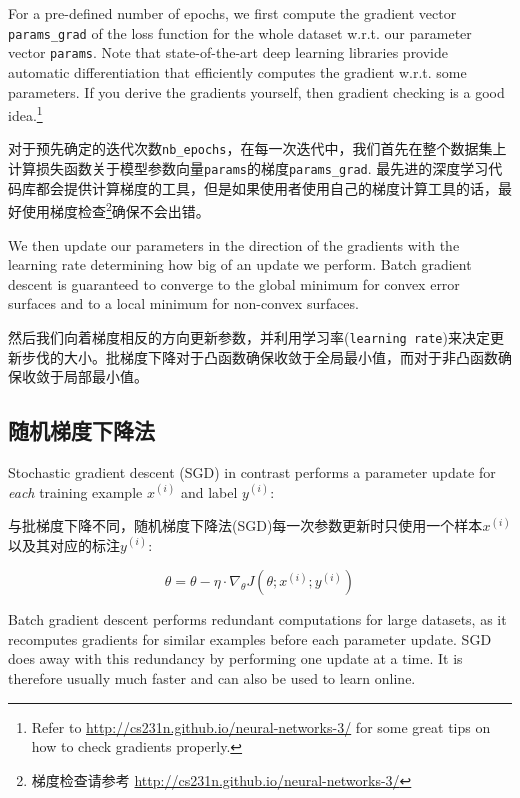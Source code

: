 \documentclass{article}
\begin{document}
For a pre-defined number of epochs,  we first compute the gradient vector \lstinline{params_grad} of the loss function for the whole dataset w.r.t. our parameter vector \lstinline{params}.  Note that state-of-the-art deep learning libraries provide automatic differentiation that efficiently computes the gradient w.r.t. some parameters. If you derive the gradients yourself, then gradient checking is a good idea.\footnote{Refer to \url{http://cs231n.github.io/neural-networks-3/} for some great tips on how to check gradients properly.}

对于预先确定的迭代次数\lstinline{nb_epochs}，在每一次迭代中，我们首先在整个数据集上计算损失函数关于模型参数向量\lstinline{params}的梯度\lstinline{params_grad}. 最先进的深度学习代码库都会提供计算梯度的工具，但是如果使用者使用自己的梯度计算工具的话，最好使用梯度检查\footnote{梯度检查请参考 \url{http://cs231n.github.io/neural-networks-3/}}确保不会出错。

We then update our parameters in the direction of the gradients with the learning rate determining how big of an update we perform. Batch gradient descent is guaranteed to converge to the global minimum for convex error surfaces and to a local minimum for non-convex surfaces.

然后我们向着梯度相反的方向更新参数，并利用学习率(\lstinline{learning rate})来决定更新步伐的大小。批梯度下降对于凸函数确保收敛于全局最小值，而对于非凸函数确保收敛于局部最小值。

\subsection{随机梯度下降法}

Stochastic gradient descent (SGD) in contrast performs a parameter update for \emph{each} training example $x^{(i)}$ and label $y^{(i)}$:

与批梯度下降不同，随机梯度下降法(SGD)每一次参数更新时只使用一个样本$x^{(i)}$以及其对应的标注$y^{(i)}$:

\begin{equation}
\theta = \theta - \eta \cdot \nabla_\theta J( \theta; x^{(i)}; y^{(i)})
\end{equation}

Batch gradient descent performs redundant computations for large datasets, as it recomputes gradients for similar examples before each parameter update. SGD does away with this redundancy by performing one update at a time. It is therefore usually much faster and can also be used to learn online.
\end{document}

